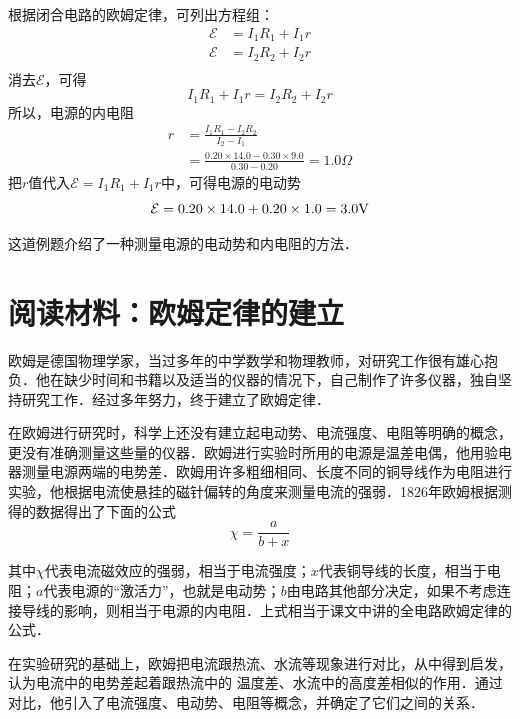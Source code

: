 \begin{solution}
    根据闭合电路的欧姆定律，可列出方程组：
    \[\begin{split}
        \mathcal{E}&=I_1R_1+I_1r\\
        \mathcal{E}&=I_2R_2+I_2r\\
    \end{split}\]
    消去$\mathcal{E}$，可得
    \[I_1 R_1+I_1r=I_2R_2+I_2r\]
    所以，电源的内电阻
\[\begin{split}
    r&=\frac{I_1R_1-I_2R_2}{I_2-I_1}\\
    &=\frac{0.20\times 14.0-0.30\times 9.0}{0.30-0.20}=1.0\Omega
\end{split}\]
    把$r$值代入$\mathcal{E}=I_1R_1+I_1r$中，可得电源的电动势
    \[\mathcal{E}=0.20\times 14.0+0.20\times 1.0=3.0{\rm V} \]
\end{solution}

这道例题介绍了一种测量电源的电动势和内电阻的方法．


\section*{阅读材料：欧姆定律的建立}

欧姆是德国物理学家，当过多年的中学数学和物理教师，对研究工作很有雄心抱负．他在缺少时间和书籍以及适当的仪器的情况下，自己制作了许多仪器，独自坚持研究工作．经过多年努力，终于建立了欧姆定律．

在欧姆进行研究时，科学上还没有建立起电动势、电流强度、电阻等明确的概念，更没有准确测量这些量的仪器．欧姆进行实验时所用的电源是温差电偶，他用验电器测量电源两端的电势差．欧姆用许多粗细相同、长度不同的铜导线作为电阻进行实验，他根据电流使悬挂的磁针偏转的角度来测量电流的强弱．1826年欧姆根据测得的数据得出了下面的公式
\[\chi=\frac{a}{b+x}\]

其中$\chi$代表电流磁效应的强弱，相当于电流强度；$x$代表铜导线的长度，相当于电阻；$a$代表电源的“激活力”，也就是电动势；$b$由电路其他部分决定，如果不考虑连接导线的影响，则相当于电源的内电阻．上式相当于课文中讲的全电路欧姆定律的公式．

在实验研究的基础上，欧姆把电流跟热流、水流等现象进行对比，从中得到启发，认为电流中的电势差起着跟热流中的
温度差、水流中的高度差相似的作用．通过对比，他引入了电流强度、电动势、电阻等概念，并确定了它们之间的关系．


